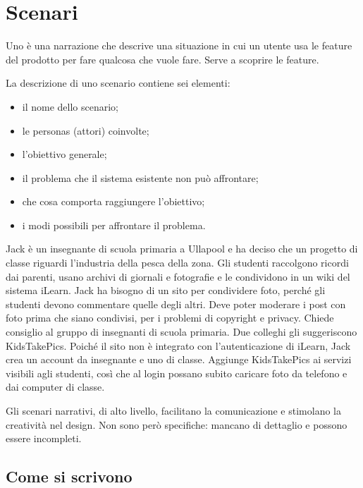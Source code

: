 \section{Scenari}
\label{sec:feature-scenari}

\begin{definizione}[Scenario]
Uno  è una narrazione che descrive una situazione in cui un utente usa le feature del prodotto per
fare qualcosa che vuole fare. Serve a scoprire le feature.
\end{definizione}

La descrizione di uno scenario contiene sei elementi:
\begin{itemize}
  \item il nome dello scenario;
  \item le personas (attori) coinvolte;
  \item l'obiettivo generale;
  \item il problema che il sistema esistente non può affrontare;
  \item che cosa comporta raggiungere l'obiettivo;
  \item i modi possibili per affrontare il problema.
\end{itemize}

\begin{esempio}
Jack è un insegnante di scuola primaria a Ullapool e ha deciso che un progetto di classe riguardi l'industria della
pesca della zona. Gli studenti raccolgono ricordi dai parenti, usano archivi di giornali e fotografie e le condividono
in un wiki del sistema iLearn. Jack ha bisogno di un sito per condividere foto, perché gli studenti devono commentare
quelle degli altri. Deve poter moderare i post con foto prima che siano condivisi, per i problemi di copyright e
privacy. Chiede consiglio al gruppo di insegnanti di scuola primaria. Due colleghi gli suggeriscono KidsTakePics.
Poiché il sito non è integrato con l'autenticazione di iLearn, Jack crea un account da insegnante e uno di classe.
Aggiunge KidsTakePics ai servizi visibili agli studenti, così che al login possano subito caricare foto da telefono e
dai computer di classe.
\end{esempio}

Gli scenari narrativi, di alto livello, facilitano la comunicazione e stimolano la creatività nel design. Non sono però
specifiche: mancano di dettaglio e possono essere incompleti.

\subsection*{Come si scrivono}

